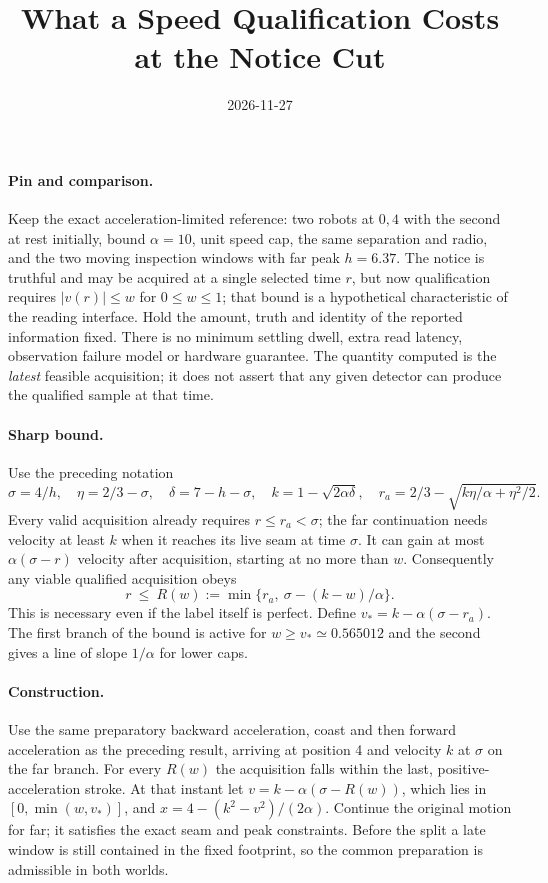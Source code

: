 \documentclass[11pt]{article}
\title{What a Speed Qualification Costs at the Notice Cut}
\date{2026-11-27}
\begin{document}
\maketitle

\paragraph{Pin and comparison.}
Keep the exact acceleration-limited reference: two robots at \(0,4\)
with the second at rest initially, bound \(\alpha=10\), unit speed
cap, the same separation and radio, and the two moving inspection
windows with far peak \(h=6.37\). The notice is truthful and may be
acquired at a single selected time \(r\), but now qualification requires
\(|v(r)|\le w\) for \(0\le w\le1\); that bound is a hypothetical
characteristic of the reading interface. Hold the amount, truth and
identity of the reported information fixed. There is no minimum
settling dwell, extra read latency, observation failure model or
hardware guarantee. The quantity computed is the \emph{latest}
feasible acquisition; it does not assert that any given detector can
produce the qualified sample at that time.

\paragraph{Sharp bound.}
Use the preceding notation
\[
 \sigma=4/h,\quad \eta=2/3-\sigma,\quad
 \delta=7-h-\sigma,\quad k=1-\sqrt{2\alpha\delta},\quad
 r_a=2/3-\sqrt{k\eta/\alpha+\eta^2/2}.
\]
Every valid acquisition already requires \(r\le r_a<\sigma\);
the far continuation needs velocity at least \(k\) when it reaches
its live seam at time \(\sigma\). It can gain at most
\(\alpha(\sigma-r)\) velocity after acquisition, starting at no
more than \(w\). Consequently any viable qualified acquisition obeys
\[
 r\ \le\ R(w)
 :=\min\bigl\{r_a,\ \sigma-(k-w)/\alpha\bigr\}.
\]
This is necessary even if the label itself is perfect. Define
\(v_* = k-\alpha(\sigma-r_a)\). The first branch of the bound
is active for \(w\ge v_*\simeq0.565012\) and the second gives
a line of slope \(1/\alpha\) for lower caps.

\paragraph{Construction.}
Use the same preparatory backward acceleration, coast and then
forward acceleration as the preceding result, arriving at
position 4 and velocity \(k\) at \(\sigma\) on the far branch.
For every \(R(w)\) the acquisition falls within the last,
positive-acceleration stroke. At that instant let
\(v=k-\alpha(\sigma-R(w))\), which lies in \([0,\min(w,v_*)]\),
and
\(x=4-(k^2-v^2)/(2\alpha)\). Continue the original motion for
far; it satisfies the exact seam and peak constraints. Before
the split a late window is still contained in the fixed footprint,
so the common preparation is admissible in both worlds.
\end{document}
